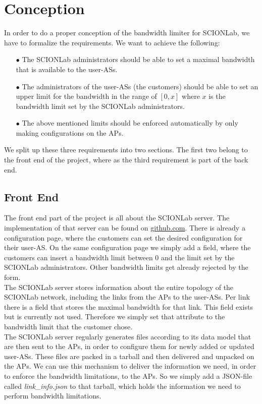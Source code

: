 \chapter{Conception}
In order to do a proper conception of the bandwidth limiter for \acs{SCIONLab}, we have to formalize the requirements. We want to achieve the following:

\begin{enumerate}
\item[$\bullet$]The \acs{SCIONLab} administrators should be able to set a maximal bandwidth that is available to the user-\acsp{AS}.
\item[$\bullet$]The administrators of the user-\acsp{AS} (the customers) should be able to set an upper limit for the bandwidth in the range of $[0,x]$ where $x$ is the bandwidth limit set by the \acs{SCIONLab} administrators.
\item[$\bullet$] The above mentioned limits should be enforced automatically by only making configurations on the \acsp{AP}.
\end{enumerate}

We split up these three requirements into two sections. The first two belong to the front end of the project, where as the third requirement is part of the back end.

\section{Front End}

The front end part of the project is all about the \acs{SCIONLab} server. The implementation of that server can be found on \href{https://github.com/netsec-ethz/scionlab}{github.com}. There is already a configuration page, where the customers can set the desired configuration for their user-\acs{AS}. On the same configuration page we simply add a field, where the customers can insert a bandwidth limit between 0 and the limit set by the \acs{SCIONLab} administrators. Other bandwidth limits get already rejected by the form.
\\
The \acs{SCIONLab} server stores information about the entire topology of the \acs{SCIONLab} network, including the links from the \acsp{AP} to the user-\acsp{AS}. Per link there is a field that stores the maximal bandwidth for that link. This field exists but is currently not used. Therefore we simply set that attribute to the bandwidth limit that the customer chose.
\\
The \acs{SCIONLab} server regularly generates files according to its data model that are then sent to the \acsp{AP}, in order to configure them for newly added or updated user-\acsp{AS}. These files are packed in a tarball and then delivered and unpacked on the \acsp{AP}. We can use this mechanism to deliver the information we need, in order to enforce the bandwidth limitations, to the \acsp{AP}. So we simply add a \ac{JSON}-file called \textit{link\_info.json} to that tarball, which holds the information we need to perform bandwidth limitations.

